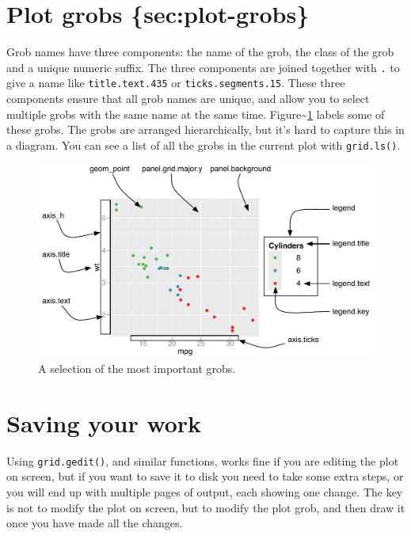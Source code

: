 \section{Plot grobs \{sec:plot-grobs\}}

Grob names have three components: the name of the grob, the class of the
grob and a unique numeric suffix. The three components are joined
together with \texttt{.} to give a name like \texttt{title.text.435} or
\texttt{ticks.segments.15}. These three components ensure that all grob
names are unique, and allow you to select multiple grobs with the same
name at the same time. Figure\textasciitilde{}\ref{fig:grobs} labels
some of these grobs. The grobs are arranged hierarchically, but it's
hard to capture this in a diagram. You can see a list of all the grobs
in the current plot with \texttt{grid.ls()}. 

\begin{figure}[htbp]
  \centering
    \includegraphics[width=\linewidth]{diagrams/grid-grobs}
  \caption{A selection of the most important grobs.}
  \label{fig:grobs}
\end{figure}

\section{Saving your work}\label{sec:grid-save}

Using \texttt{grid.gedit()}, and similar functions, works fine if you
are editing the plot on screen, but if you want to save it to disk you
need to take some extra steps, or you will end up with multiple pages of
output, each showing one change. The key is not to modify the plot on
screen, but to modify the plot grob, and then draw it once you have made
all the changes. 

